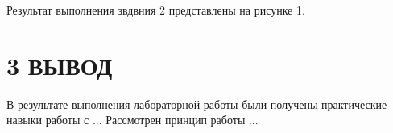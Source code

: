 \documentclass[a4paper,14pt]{extarticle} %
\begin{document}
% 

  Результат выполнения звдвния 2 представлены 
на рисунке 1.
\begin{center}
\end{center}

\section*{3 ВЫВОД}

  В результате выполнения лабораторной работы были получены практические навыки
работы с ... Рассмотрен принцип работы ...
\end{document}
